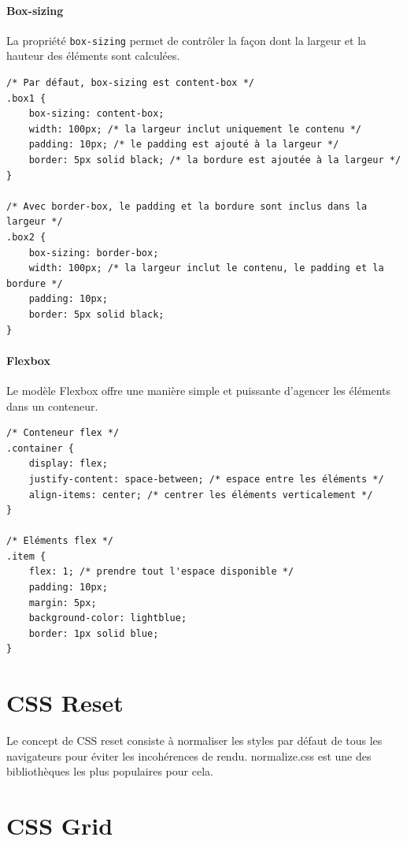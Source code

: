 \documentclass{report}
\begin{document}
\begin{multicols*}{2}
\paragraph{Box-sizing}
La propriété \texttt{box-sizing} permet de contrôler la façon dont la largeur et la hauteur des éléments sont calculées.

\begin{lstlisting}[style=CSSDraculaLight]
/* Par défaut, box-sizing est content-box */
.box1 {
    box-sizing: content-box;
    width: 100px; /* la largeur inclut uniquement le contenu */
    padding: 10px; /* le padding est ajouté à la largeur */
    border: 5px solid black; /* la bordure est ajoutée à la largeur */
}

/* Avec border-box, le padding et la bordure sont inclus dans la largeur */
.box2 {
    box-sizing: border-box;
    width: 100px; /* la largeur inclut le contenu, le padding et la bordure */
    padding: 10px;
    border: 5px solid black;
}
\end{lstlisting}


\paragraph{Flexbox}
Le modèle Flexbox offre une manière simple et puissante d'agencer les éléments dans un conteneur.

\begin{lstlisting}[style=CSSDraculaLight]
/* Conteneur flex */
.container {
    display: flex;
    justify-content: space-between; /* espace entre les éléments */
    align-items: center; /* centrer les éléments verticalement */
}

/* Eléments flex */
.item {
    flex: 1; /* prendre tout l'espace disponible */
    padding: 10px;
    margin: 5px;
    background-color: lightblue;
    border: 1px solid blue;
}
\end{lstlisting}


\section{CSS Reset}
Le concept de CSS reset consiste à normaliser les styles par défaut de tous les navigateurs pour éviter les incohérences de rendu. normalize.css est une des bibliothèques les plus populaires pour cela.


\section*{CSS Grid}


\end{multicols*}
\end{document}

